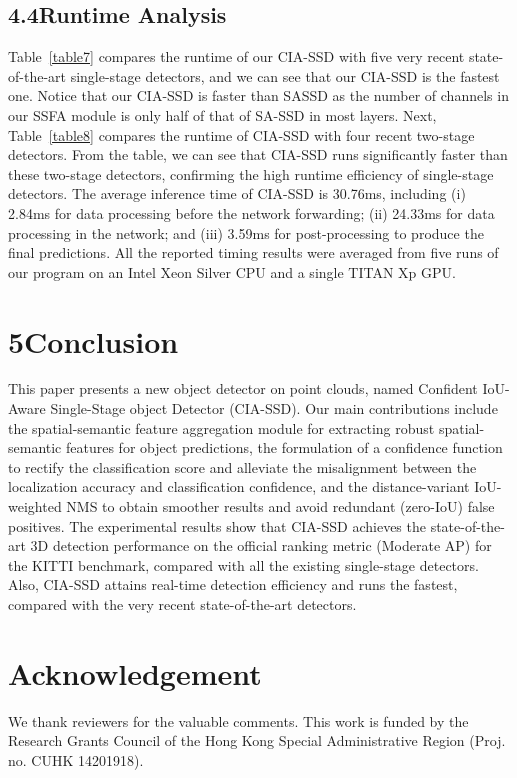 \documentclass[letterpaper]{article}
\begin{document}
\subsection{4.4\quad Runtime Analysis}
Table~\ref{table7} compares the runtime of our CIA-SSD with five very recent state-of-the-art single-stage detectors, and we can see that our CIA-SSD is the fastest one.
Notice that our CIA-SSD is faster than SASSD as the number of channels in our SSFA module is only half of that of SA-SSD in most layers.
Next, Table~\ref{table8} compares the runtime of CIA-SSD with four recent two-stage detectors.
From the table, we can see that CIA-SSD runs significantly faster than these two-stage detectors, confirming the high runtime efficiency of single-stage detectors.
The average inference time of CIA-SSD is 30.76ms, including
(i) 2.84ms for data processing before the network forwarding;
(ii) 24.33ms for data processing in the network; and
(iii) 3.59ms for post-processing to produce the final predictions.
All the reported timing results were averaged from five runs of our program on an Intel Xeon Silver CPU and a single TITAN Xp GPU.





\section{5\quad Conclusion}

This paper presents a new object detector on point clouds, named Confident IoU-Aware Single-Stage object Detector (CIA-SSD).
Our main contributions include the spatial-semantic feature aggregation module for extracting robust spatial-semantic features for object predictions, the formulation of a confidence function to rectify the classification score and alleviate the misalignment between the localization accuracy and classification confidence, and the distance-variant IoU-weighted NMS to obtain smoother results and avoid redundant (zero-IoU) false positives.
The experimental results show that CIA-SSD achieves the state-of-the-art 3D detection performance on the official ranking metric (Moderate AP) for the KITTI benchmark, compared with all the existing single-stage detectors.
Also, CIA-SSD attains real-time detection efficiency and runs the fastest, compared with the very recent state-of-the-art detectors.



\section{Acknowledgement}
We thank reviewers for the valuable comments. This work is funded by the Research Grants Council of the Hong Kong Special Administrative Region (Proj. no. CUHK 14201918).





\ifx\allfiles\undefined
\end{document}

